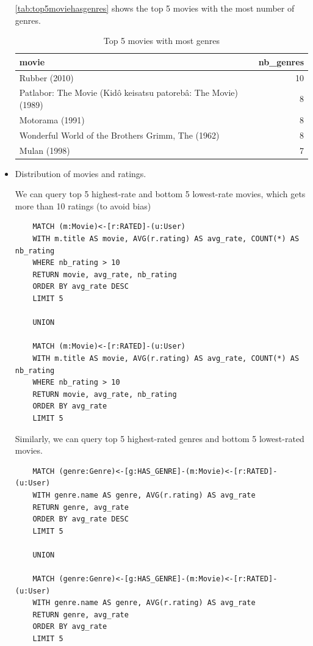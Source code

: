 \documentclass{article}
\begin{document}
\begin{itemize}
    \autoref{tab:top5moviehasgenres} shows the top 5 movies with the most number of genres. 
    
    \begin{table}[!ht]
    \centering
    \caption{Top 5 movies with most genres}
    \label{tab:top5moviehasgenres}
    \begin{tabular}{lr}
    \hline
        movie & nb\_genres \\ \hline
        Rubber (2010) & 10 \\ 
        Patlabor: The Movie (Kidô keisatsu patorebâ: The Movie) (1989) & 8 \\ 
        Motorama (1991) & 8 \\ 
        Wonderful World of the Brothers Grimm, The (1962) & 8 \\ 
        Mulan (1998) & 7 \\ \hline
    \end{tabular}
    \end{table}

    \item Distribution of movies and ratings. 

    We can query top 5 highest-rate and bottom 5 lowest-rate movies, which gets more than 10 ratings (to avoid bias)

    \begin{verbatim}
    MATCH (m:Movie)<-[r:RATED]-(u:User)
    WITH m.title AS movie, AVG(r.rating) AS avg_rate, COUNT(*) AS nb_rating
    WHERE nb_rating > 10
    RETURN movie, avg_rate, nb_rating
    ORDER BY avg_rate DESC
    LIMIT 5
    
    UNION
    
    MATCH (m:Movie)<-[r:RATED]-(u:User)
    WITH m.title AS movie, AVG(r.rating) AS avg_rate, COUNT(*) AS nb_rating
    WHERE nb_rating > 10
    RETURN movie, avg_rate, nb_rating
    ORDER BY avg_rate
    LIMIT 5 
    \end{verbatim}

    Similarly, we can query top 5 highest-rated genres and bottom 5 lowest-rated movies. 

    \begin{verbatim}
    MATCH (genre:Genre)<-[g:HAS_GENRE]-(m:Movie)<-[r:RATED]-(u:User)
    WITH genre.name AS genre, AVG(r.rating) AS avg_rate
    RETURN genre, avg_rate
    ORDER BY avg_rate DESC
    LIMIT 5
    
    UNION 
    
    MATCH (genre:Genre)<-[g:HAS_GENRE]-(m:Movie)<-[r:RATED]-(u:User)
    WITH genre.name AS genre, AVG(r.rating) AS avg_rate
    RETURN genre, avg_rate
    ORDER BY avg_rate 
    LIMIT 5
    \end{verbatim}


\end{itemize}
\end{document}
